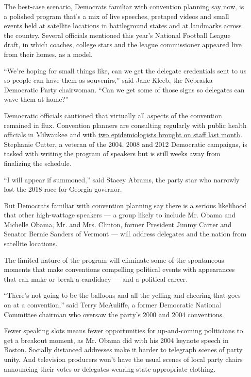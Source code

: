 The best-case scenario, Democrats familiar with convention planning say
now, is a polished program that's a mix of live speeches, pretaped
videos and small events held at satellite locations in battleground
states and at landmarks across the country. Several officials mentioned
this year's National Football League draft, in which coaches, college
stars and the league commissioner appeared live from their homes, as a
model.

``We're hoping for small things like, can we get the delegate
credentials sent to us so people can have them as souvenirs,'' said Jane
Kleeb, the Nebraska Democratic Party chairwoman. ``Can we get some of
those signs so delegates can wave them at home?''

Democratic officials cautioned that virtually all aspects of the
convention remained in flux. Convention planners are consulting
regularly with public health officials in Milwaukee and with
\href{https://www.nytimes3xbfgragh.onion/2020/06/24/us/politics/democratic-convention-milwaukee-coronavirus.html}{two
epidemiologists brought on staff last month}. Stephanie Cutter, a
veteran of the 2004, 2008 and 2012 Democratic campaigns, is tasked with
writing the program of speakers but is still weeks away from finalizing
the schedule.

``I will appear if summoned,'' said Stacey Abrams, the party star who
narrowly lost the 2018 race for Georgia governor.

But Democrats familiar with convention planning say there is a serious
likelihood that other high-wattage speakers --- a group likely to
include Mr. Obama and Michelle Obama, Mr. and Mrs. Clinton, former
President Jimmy Carter and Senator Bernie Sanders of Vermont --- will
address delegates and the nation from satellite locations.

The limited nature of the program will eliminate some of the spontaneous
moments that make conventions compelling political events with
appearances that can make or break a candidacy --- and a political
career.

``There's not going to be the balloons and all the yelling and cheering
that goes on at a convention,'' said Terry McAuliffe, a former
Democratic National Committee chairman who oversaw the party's 2000 and
2004 conventions.

Fewer speaking slots means fewer opportunities for up-and-coming
politicians to get a breakout moment, as Mr. Obama did with his 2004
keynote speech in Boston. Socially distanced addresses make it harder to
telegraph scenes of party unity. And television producers won't have the
usual scenes of local party chairs announcing their votes or delegates
wearing state-appropriate clothing.

